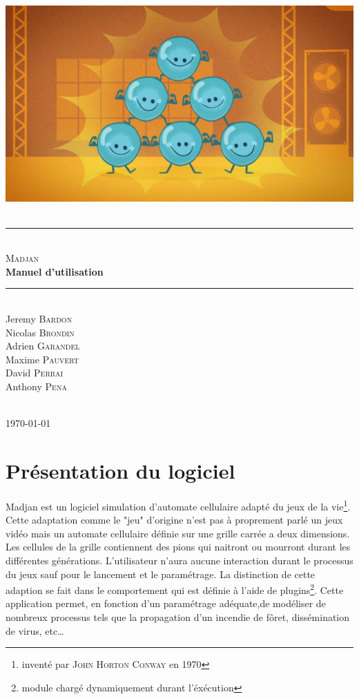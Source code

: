 \documentclass[pdftex,12pt,a4paper]{article}
\author{\docauthor}
\title{\doctitle}
\date{\today}
\newcommand{\docauthor}{
			Jeremy  \textsc{Bardon} \\
			Nicolas \textsc{Brondin} \\
			Adrien \textsc{Garandel} \\
            Maxime \textsc{Pauvert} \\
            David \textsc{Perrai} \\
            Anthony \textsc{Pena}           
 }
\newcommand{\doctitle}{Madjan}
\newcommand{\name}[1]{\textsc{#1}}
\newcommand{\HRule}{\rule{\linewidth}{0.5mm}}
\begin{document}
  \begin{titlepage}
    \begin{center}
      \includegraphics[width=15cm]{./images/cellule.jpg}~\\[3cm]

      \HRule \\[0.5cm]
      \textsc{\LARGE \doctitle \\[0.5cm]}
      \textbf{\Large Manuel d'utilisation \\[0.5cm]}
      \HRule \\[1.0cm]

		\docauthor
      ~\\[1.0cm]
      \today

      \vfill{}
      
    \end{center}
  \end{titlepage}




\setcounter{page}{1}

\newpage
	

  \section{Présentation du logiciel}
	
	Madjan est un logiciel simulation d'automate cellulaire  adapté du jeux de la vie\footnote{inventé par \name{John Horton Conway} en 1970}. Cette adaptation comme le "jeu" d'origine n'est pas à proprement parlé un jeux vidéo mais un  automate  cellulaire définie sur une grille carrée a deux dimensions. Les cellules de la grille contiennent des pions qui naitront ou mourront durant les différentes générations. L'utilisateur n'aura aucune interaction durant le processus du jeux sauf pour le lancement et le paramétrage.
 	La distinction de cette adaption se fait dans le comportement qui est définie à l'aide de plugins\footnote{module chargé dynamiquement durant l'éxécution}. 
    Cette application permet, en fonction d'un paramétrage adéquate,de modéliser de nombreux processus tels que la propagation d'un incendie de fôret, dissémination de virus, etc\dots 
    
\end{document}
